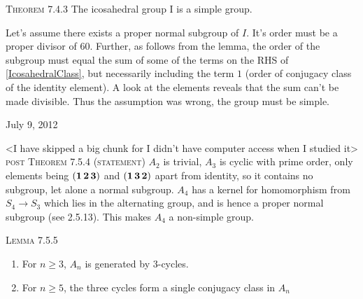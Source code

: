 \documentclass[12pt]{article}
\begin{document}
\par
\textsc {Theorem 7.4.3 } The icosahedral group I is a simple group.
\par
Let's assume there exists a proper normal subgroup of $I$. It's order must be a proper divisor of $60$. Further, as follows from the lemma, the order of the subgroup must equal the sum of some of the terms on the RHS of \ref{IcosahedralClass}, but necessarily including the term $1$ (order of conjugacy class of the identity element). A look at the elements reveals that the sum can't be made divisible. Thus the assumption was wrong, the group must be simple.\\
\par
\begin{flushright} {\small July 9, 2012} \end{flushright}
<I have skipped a big chunk for I didn't have computer access when I studied it>\\
\textsc {post Theorem 7.5.4 (statement) } $A_{2}$ is trivial, $A_{3}$ is cyclic with prime order, only elements being $({\bf 1\,2\,3})$ and $({\bf 1\,3\,2})$ apart from identity, so it contains no subgroup, let alone a normal subgroup. $A_{4}$ has a kernel for homomorphism from $S_{4} \rightarrow S_{3}$ which lies in the alternating group, and is hence a proper normal subgroup (see 2.5.13). This makes $A_{4}$ a non-simple group.
\par
\textsc {Lemma 7.5.5}
\begin{enumerate}
\item For $n \geq 3$, $A_{n}$ is generated by 3-cycles.
\item For $n \geq 5$, the three cycles form a single conjugacy class in $A_{n}$
\end{enumerate}
\end{document}
